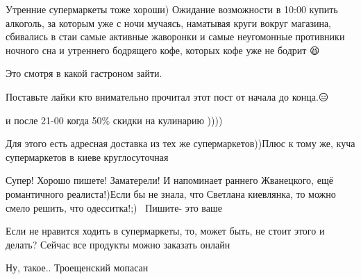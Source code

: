 \begin{itemize}
Утренние супермаркеты тоже хороши) Ожидание возможности в 10:00 купить
алкоголь, за которым уже с ночи мучаясь, наматывая круги вокруг магазина,
сбивались в стаи самые активные жаворонки и самые неугомонные противники
ночного сна и утреннего бодрящего кофе, которых кофе уже не бодрит 😆


Это смотря в какой гастроном зайти.

Поставьте лайки кто внимательно прочитал этот пост от начала до конца.😑

и после 21-00 когда 50\% скидки на кулинарию ))))

Для этого есть адресная доставка из тех же супермаркетов))Плюс к тому же, куча супермаркетов в киеве круглосуточная


Супер! Хорошо пишете! Заматерели! И напоминает раннего Жванецкого, ещё
романтичного реалиста!)Если бы не знала, что Светлана киевлянка, то можно смело
решить, что одесситка!;)👏💪🌟Пишите- это ваше👌🏻

Если не нравится ходить в супермаркеты, то, может быть, не стоит этого и делать? Сейчас все продукты можно заказать онлайн

Ну, такое.. Троещенский мопасан


\end{itemize}
